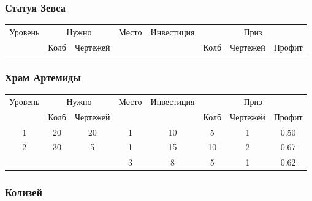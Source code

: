 \subsubsection{Статуя Зевса}

\begin{longtable}[c]{|c|c|c|c|c|c|c|c|}
    \hline
    \multirow{ 2}{*}{\small Уровень} &
    \multicolumn{2}{|c|}{\small Нужно} &
    \multirow{ 2}{*}{\small Место} & 
    \multirow{ 2}{*}{\small Инвестиция} & 
    \multicolumn{3}{|c|}{\small Приз} \\\cline{2-3}\cline{6-8}
    &
    {\small Колб} & 
    {\small Чертежей} & 
    & &
    {\small Колб} & 
    {\small Чертежей} & 
    {\small Профит}
    \\\hline\endhead
\end{longtable}


\subsubsection{Храм Артемиды}

\begin{longtable}[c]{|c|c|c|c|c|c|c|c|}
    \hline
    \multirow{ 2}{*}{\small Уровень} &
    \multicolumn{2}{|c|}{\small Нужно} &
    \multirow{ 2}{*}{\small Место} & 
    \multirow{ 2}{*}{\small Инвестиция} & 
    \multicolumn{3}{|c|}{\small Приз} \\\cline{2-3}\cline{6-8}
    &
    {\small Колб} & 
    {\small Чертежей} & 
    & &
    {\small Колб} & 
    {\small Чертежей} & 
    {\small Профит}
    \\\hline\endhead
    \multirow{1}{*}{1} & \multirow{1}{*}{20} & \multirow{1}{*}{20} & 1 & 10 & 5 & 1 & 0.50 \\\hline
    \multirow{2}{*}{2} & \multirow{2}{*}{30} & \multirow{2}{*}{5} & 1 & 15 & 10 & 2 & 0.67 \\\cline{4-8}
    & & & 3 & 8 & 5 & 1 & 0.62 \\\hline
\end{longtable}


\subsubsection{Колизей}

